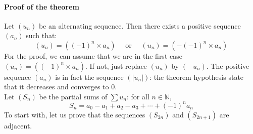 \documentclass[notitlepage]{math}
\begin{document}
\paragraph{Proof of the theorem}
Let $(u_n)$ be an alternating sequence. Then there exists a positive sequence $(a_n)$ such that:
\[(u_n) = ((-1)^n \times a_n) \quad \text{ or } \quad (u_n) = (-(-1)^{n} \times a_n)\]
For the proof, we can assume that we are in the first case $(u_n) = ((-1)^n \times a_n)$. If not, just replace $(u_n)$ by $(-u_n)$. 
The positive sequence $(a_n)$ is in fact the sequence $(\left\lvert u_n \right\rvert)$: the theorem hypothesis state that it decreases and converges to $0$.\\[0.5em]
Let $(S_n)$ be the partial sums of $\sum u_n$: for all $n \in \mathbb{N}$, 
\[S_n = a_0 - a_1 + a_2 - a_3 + \cdots + (-1)^n a_n\]
To start with, let us prove that the sequences $(S_{2n})$ and $(S_{2n+1})$ are adjacent.
\end{document}
